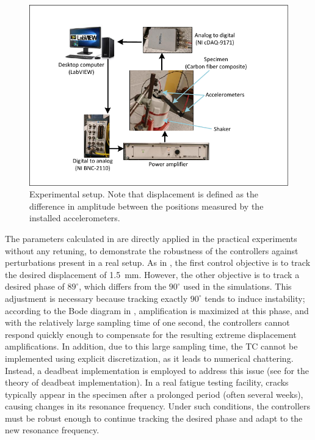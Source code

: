 \documentclass[lettersize,journal]{IEEEtran}
\begin{document}
\begin{figure}
    \centering    \includegraphics[width=\linewidth]{F_experiments.pdf}
    \caption{Experimental setup. Note that displacement is defined as the difference in amplitude between the positions measured by the installed accelerometers.
    }
    \label{F_setup}
\end{figure}

The parameters calculated in  are directly applied in the practical experiments without any retuning, to demonstrate the robustness of the controllers against perturbations present in a real setup. As in , the first control objective is to track the desired displacement of 1.5~mm. However, the other objective is to track a desired phase of $89^\circ$, which differs from the $90^\circ$ used in the simulations. This adjustment is necessary because tracking exactly $90^\circ$ tends to induce instability; according to the Bode diagram in , amplification is maximized at this phase, and with the relatively large sampling time of one second, the controllers cannot respond quickly enough to compensate for the resulting extreme displacement amplifications. In addition, due to this large sampling time, the TC cannot be implemented using explicit discretization, as it leads to numerical chattering. Instead, a deadbeat implementation is employed to address this issue (see  for the theory of deadbeat implementation). In a real fatigue testing facility, cracks typically appear in the specimen after a prolonged period (often several weeks), causing changes in its resonance frequency. Under such conditions, the controllers must be robust enough to continue tracking the desired phase and adapt to the new resonance frequency.
\end{document}
